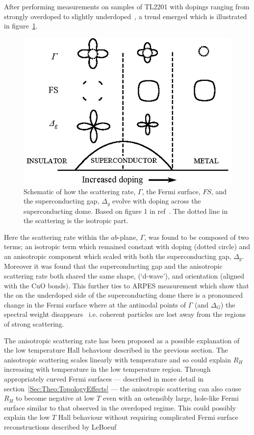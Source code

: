 After performing measurements on samples of \ac{TL2201} with dopings ranging from strongly overdoped to slightly underdoped~\cite{Abdel-Jawad2006}, a trend emerged which is illustrated in figure~\ref{Fig:Intro:AnisotropyPhase}. 
\begin{figure}[htbp]
    \begin{center}
        \includegraphics[scale=1.2]{Chapter-Introduction/Figures/AnisotropyPhase/AnisotropyPhase}
        \caption{Schematic of how the scattering rate, $\Gamma$, the Fermi surface, $FS$, and the superconducting gap, $\Delta_g$ evolve with doping across the superconducting dome. Based on figure 1 in ref~\cite{Taillefer2006}. The dotted line in the scattering is the isotropic part.}
        \label{Fig:Intro:AnisotropyPhase}
    \end{center}
\end{figure}
Here the scattering rate within the $ab$-plane, $\Gamma$, was found to be composed of two terms; an isotropic term which remained constant with doping (dotted circle) and an anisotropic component which scaled with both the superconducting gap, $\Delta_g$. Moreover it was found that the superconducting gap and the anisotropic scattering rate both shared the same shape, (`d-wave'), and orientation (aligned with the CuO bonds). This further ties to \ac{ARPES} measurement which show that the on the underdoped side of the superconducting dome there is a pronounced change in the Fermi surface where at the antinodal points of $\Gamma$ (and $\Delta_G$) the spectral weight disappears~\cite{Norman2010} i.e. coherent particles are lost away from the regions of strong scattering.

The anisotropic scattering rate has been proposed as a possible explanation of the low temperature Hall behaviour described in the previous section. The anisotropic scattering scales linearly with temperature and so could explain $R_H$ increasing with temperature in the low temperature region. Through appropriately curved Fermi surfaces --- described in more detail in section~\ref{Sec:Theo:TopologyEffects} --- the anisotropic scattering can also cause $R_H$ to become negative at low $T$ even with an ostensibly large, hole-like Fermi surface similar to that observed in the overdoped regime. This could possibly explain the low $T$ Hall behaviour without requiring complicated Fermi surface reconstructions described by LeBoeuf \etal


